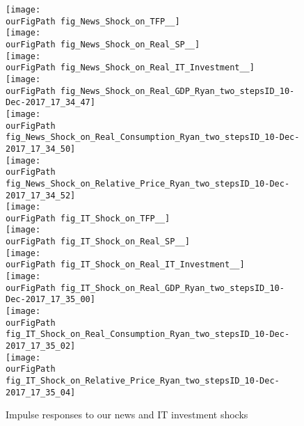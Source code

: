 \documentclass[11pt]{article}
\def \ourFigPath {../../Figures/}
\renewcommand{\[}{\begin{equation}}
\renewcommand{\]}{\end{equation}}
\begin{document}
\begin{figure}
\caption{Impulse responses to our news and IT investment shocks}
\begin{multicols}{2}
\centering 
\texttt{[image: \\ourFigPath fig\_News\_Shock\_on\_TFP\_\_]} \\
\vspace{0.7cm}
\texttt{[image: \\ourFigPath fig\_News\_Shock\_on\_Real\_SP\_\_]}\\
\vspace{0.7cm}
\texttt{[image: \\ourFigPath fig\_News\_Shock\_on\_Real\_IT\_Investment\_\_]}\\
\vspace{0.7cm}
\texttt{[image: \\ourFigPath fig\_News\_Shock\_on\_Real\_GDP\_Ryan\_two\_stepsID\_10-Dec-2017\_17\_34\_47]}\\ 
\vspace{0.7cm}
\texttt{[image: \\ourFigPath fig\_News\_Shock\_on\_Real\_Consumption\_Ryan\_two\_stepsID\_10-Dec-2017\_17\_34\_50]}\\ 
\vspace{0.7cm}
\texttt{[image: \\ourFigPath fig\_News\_Shock\_on\_Relative\_Price\_Ryan\_two\_stepsID\_10-Dec-2017\_17\_34\_52]}\\ 

\texttt{[image: \\ourFigPath fig\_IT\_Shock\_on\_TFP\_\_]} \\
\vspace{0.7cm}
\texttt{[image: \\ourFigPath fig\_IT\_Shock\_on\_Real\_SP\_\_]} \\
\vspace{0.7cm}
\texttt{[image: \\ourFigPath fig\_IT\_Shock\_on\_Real\_IT\_Investment\_\_]} \\
\vspace{0.7cm}
\texttt{[image: \\ourFigPath fig\_IT\_Shock\_on\_Real\_GDP\_Ryan\_two\_stepsID\_10-Dec-2017\_17\_35\_00]}\\
\vspace{0.7cm}
\texttt{[image: \\ourFigPath fig\_IT\_Shock\_on\_Real\_Consumption\_Ryan\_two\_stepsID\_10-Dec-2017\_17\_35\_02]}\\ 
\vspace{0.7cm}
\texttt{[image: \\ourFigPath fig\_IT\_Shock\_on\_Relative\_Price\_Ryan\_two\_stepsID\_10-Dec-2017\_17\_35\_04]}\\ 

\end{multicols}
\label{fig_irfs}
\end{figure}
\end{document}
